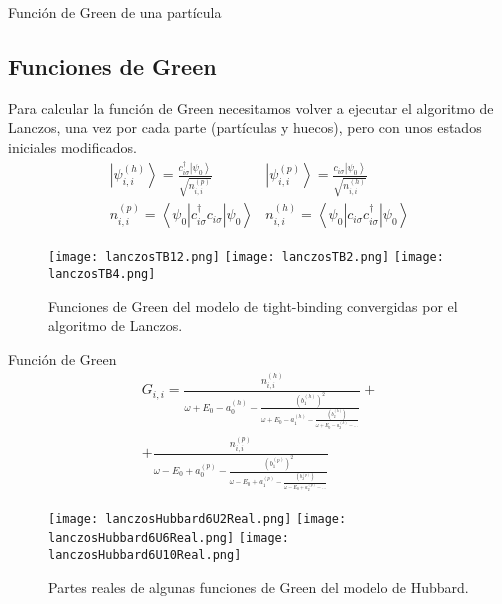 \documentclass{beamer}
\begin{document}
\begin{frame}{Función de Green de una partícula \cite{RevModPhys.66.763} \cite{GreeneDiniz2024}}
    \subsection{Funciones de Green}
    Para calcular la función de Green necesitamos volver a ejecutar el algoritmo de Lanczos, una vez por cada parte (partículas y huecos), pero con unos estados iniciales modificados.
    \begin{equation}
        \begin{array}{cc}
            \left|\psi_{i, i}^{(h)}\right\rangle = \frac{c_{i\sigma}^{\dagger}\left|\psi_0\right\rangle}{\sqrt{n_{i, i}^{(p)}}} & \left|\psi_{i, i}^{(p)}\right\rangle = \frac{c_{i\sigma}\left|\psi_0\right\rangle}{\sqrt{n_{i, i}^{(h)}}} \\ n_{i, i}^{(p)} = \left\langle\psi_0\left| c_{i\sigma}^{\dagger}c_{i\sigma}\right|\psi_0\right\rangle & n_{i, i}^{(h)} = \left\langle\psi_0\left| c_{i\sigma}c_{i\sigma}^{\dagger}\right|\psi_0\right\rangle
        \end{array}
    \end{equation}
    \begin{figure}
        \begin{center}
            \texttt{[image: lanczosTB12.png]}
            \texttt{[image: lanczosTB2.png]}
            \texttt{[image: lanczosTB4.png]}
        \end{center}
        \caption{Funciones de Green del modelo de tight-binding convergidas por el algoritmo de Lanczos.}
    \end{figure}
\end{frame}
\begin{frame}
    \begin{block}{Función de Green}
        \begin{equation}
            \begin{split}
                G_{i, i} = \frac{n_{i, i}^{(h)}}{\omega + E_0 - a_0^{(h)} - \frac{\left(b_1^{(h)}\right)^2}{\omega + E_0 - a_1^{(h)} - \frac{\left(b_2^{(h)}\right)}{\omega + E_0 - a_2^{(h)} - \ldots}}} + \\ + \frac{n_{i, i}^{(p)}}{\omega - E_0 + a_0^{(p)} - \frac{\left(b_1^{(p)}\right)^2}{\omega - E_0 + a_1^{(p)} - \frac{\left(b_2^{(p)}\right)}{\omega - E_0 + a_2^{(p)} - \ldots}}}
            \end{split}
            \label{eq:greenLanczos}
        \end{equation}
    \end{block}
    \begin{figure}
        \begin{center}
            \texttt{[image: lanczosHubbard6U2Real.png]}
            \texttt{[image: lanczosHubbard6U6Real.png]}
            \texttt{[image: lanczosHubbard6U10Real.png]}
        \end{center}
        \caption{Partes reales de algunas funciones de Green del modelo de Hubbard.}
    \end{figure}
\end{frame}
\end{document}
